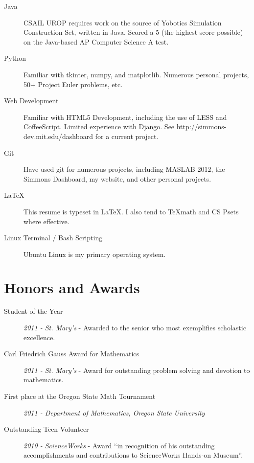 \documentclass{res}
\begin{document}
\begin{resume}
\begin{description}
				\item[Java] CSAIL UROP requires work on the source of Yobotics Simulation Construction Set, written in Java. Scored a 5 (the highest score possible) on the Java-based AP Computer Science A test.

				\item[Python] Familiar with tkinter, numpy, and matplotlib. Numerous personal projects, 50+ Project Euler problems, etc.

				\item[Web Development] Familiar with HTML5 Development, including the use of LESS and CoffeeScript. Limited experience with Django. See http://simmons-dev.mit.edu/dashboard for a current project.

				\item[Git] Have used git for numerous projects, including MASLAB 2012, the Simmons Dashboard, my website, and other personal projects.

				\item[\LaTeX] This resume is typeset in \LaTeX. I also tend to \TeX \space math and CS Psets where effective.

				\item[Linux Terminal / Bash Scripting] Ubuntu Linux is my primary operating system.

			\end{description}

		\vspace{-5pt}
		\section{Honors and Awards}

			\begin{description}

				\item[Student of the Year] \textit{2011 - St. Mary's} - Awarded to the senior who most exemplifies scholastic excellence.

				\item[Carl Friedrich Gauss Award for Mathematics] \textit{2011 - St. Mary's} - Award for outstanding problem solving and devotion to mathematics.

				\item[First place at the Oregon State Math Tournament ] \textit{2011 - Department of Mathematics, Oregon State University}

				\item[Outstanding Teen Volunteer] \textit{2010 - ScienceWorks} - Award ``in recognition of his outstanding accomplishments and contributions
	to ScienceWorks Hands-on Museum''.

			\end{description}

	\end{resume}
\end{document}

